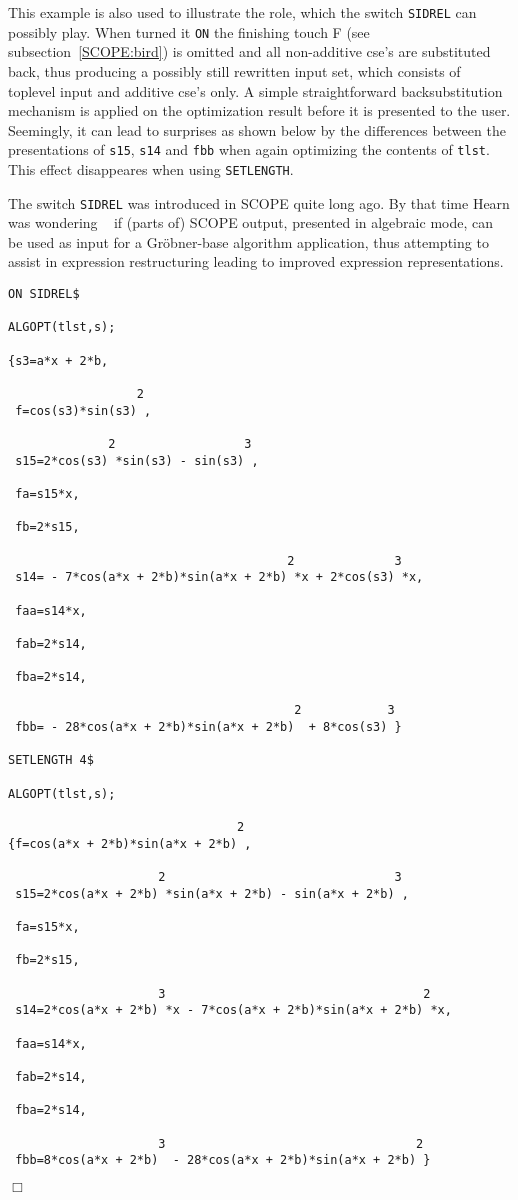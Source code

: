 This example is also used to illustrate the role, which the switch {\tt SIDREL}
can possibly play. When turned it {\tt ON} the finishing touch F (see
subsection~\ref{SCOPE:bird}) is omitted and all non-additive cse's
are substituted back, thus producing a possibly still rewritten input set,
which consists of toplevel input and additive cse's only. A simple
straightforward backsubstitution mechanism is applied on the optimization
result before it is presented to the user. Seemingly, it can lead to surprises
as shown below by the differences between the presentations of {\tt s15},
{\tt s14} and {\tt fbb} when again optimizing the contents of {\tt tlst}.
This effect disappeares when using {\tt SETLENGTH}.

The switch {\tt SIDREL} was introduced in SCOPE quite long ago. By that
time Hearn was wondering ~\cite{Hearn:85,Hearn:86} if (parts of) SCOPE output,
presented in algebraic mode, can be used as input for a Gr\"{o}bner-base
algorithm application, thus attempting to assist in expression restructuring
leading to improved expression representations.
{\small
\begin{verbatim}
ON SIDREL$

ALGOPT(tlst,s);

{s3=a*x + 2*b,

                  2
 f=cos(s3)*sin(s3) ,

              2                  3
 s15=2*cos(s3) *sin(s3) - sin(s3) ,

 fa=s15*x,

 fb=2*s15,

                                       2              3
 s14= - 7*cos(a*x + 2*b)*sin(a*x + 2*b) *x + 2*cos(s3) *x,

 faa=s14*x,

 fab=2*s14,

 fba=2*s14,

                                        2            3
 fbb= - 28*cos(a*x + 2*b)*sin(a*x + 2*b)  + 8*cos(s3) }

SETLENGTH 4$

ALGOPT(tlst,s);

                                2
{f=cos(a*x + 2*b)*sin(a*x + 2*b) ,

                     2                                3
 s15=2*cos(a*x + 2*b) *sin(a*x + 2*b) - sin(a*x + 2*b) ,

 fa=s15*x,

 fb=2*s15,

                     3                                    2
 s14=2*cos(a*x + 2*b) *x - 7*cos(a*x + 2*b)*sin(a*x + 2*b) *x,

 faa=s14*x,

 fab=2*s14,

 fba=2*s14,

                     3                                   2
 fbb=8*cos(a*x + 2*b)  - 28*cos(a*x + 2*b)*sin(a*x + 2*b) }
\end{verbatim}}
{\small
\begin{flushright}
$\Box$
\end{flushright}}
\newpage
